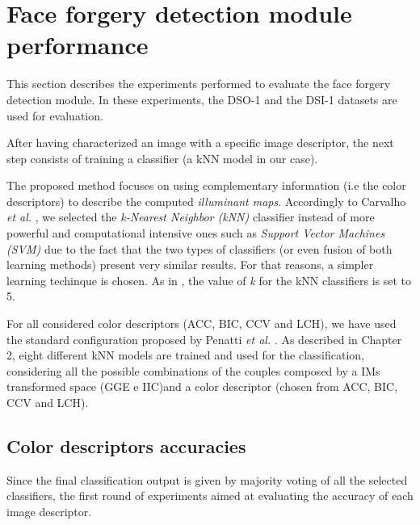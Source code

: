 \section{Face forgery detection module performance}

This section describes the experiments performed to evaluate the face forgery detection module. In these experiments, the DSO-1 and the DSI-1 datasets are used for evaluation.

After having characterized an image with a specific image descriptor, the next step consists of training a classifier (a kNN model in our case).

The proposed method focuses on using complementary information (i.e the color descriptors) to describe the computed \emph{illuminant maps}. Accordingly to Carvalho \emph{et al. }\cite{carvalho2016illuminant}, we selected the \emph{k-Nearest Neighbor (kNN)} classifier instead of more powerful and computational intensive ones such as \emph{Support Vector Machines (SVM)} due to the fact that the two types of classifiers (or even fusion of both learning methods) present very similar results. For that reasons, a simpler learning techinque is chosen\cite{carvalho2016illuminant}. As in \cite{carvalho2016illuminant}, the value of \emph{k} for the kNN classifiers is set to 5. 

For all considered color descriptors (ACC, BIC, CCV and LCH), we have used the standard configuration proposed by Penatti \emph{et al.} \cite{penatti2012comparative}. As described in Chapter 2, eight different kNN models are trained and used for the classification, considering all the possible combinations of the couples composed by a IMs transformed space (GGE e IIC)and a color descriptor (chosen from ACC, BIC, CCV and LCH).

\subsection{Color descriptors accuracies}

Since the final classification output is given by majority voting of all the selected classifiers, the first round of experiments aimed at evaluating the accuracy of each image descriptor.


